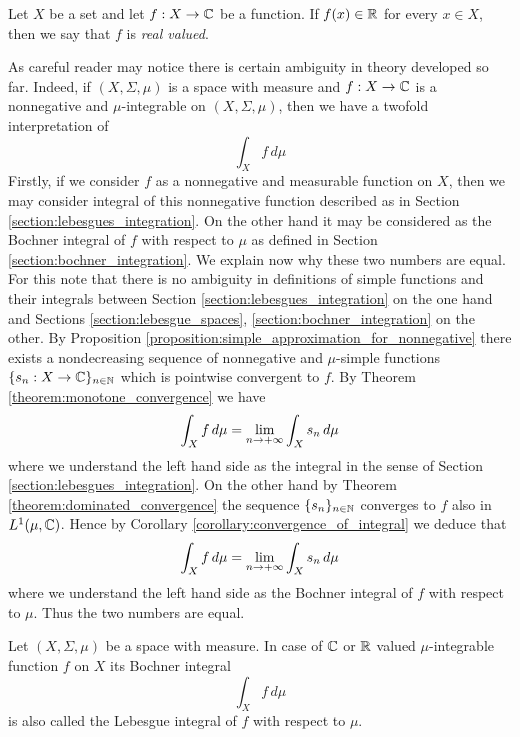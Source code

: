 \documentclass[10pt]{amsart}
\begin{document}
\begin{definition}
	Let $X$ be a set and let $f:X\rightarrow {\mathbb C}$ be a function. If $f(x)\in {\mathbb R}$ for every $x\in X$, then we say that $f$ is \textit{real valued}. 
\end{definition}
\noindent
As careful reader may notice there is certain ambiguity in theory developed so far. Indeed, if $(X,\Sigma,\mu)$ is a space with measure and $f:X\rightarrow {\mathbb C}$ is a nonnegative and $\mu$-integrable on $(X,\Sigma, \mu)$, then we have a twofold interpretation of
$$\int_Xf\,d\mu$$
Firstly, if we consider $f$ as a nonnegative and measurable function on $X$, then we may consider integral of this nonnegative function described as in Section \ref{section:lebesgues_integration}. On the other hand it may be considered as the Bochner integral of $f$ with respect to $\mu$ as defined in Section \ref{section:bochner_integration}. We explain now why these two numbers are equal. For this note that there is no ambiguity in definitions of simple functions and their integrals between Section \ref{section:lebesgues_integration} on the one hand and Sections \ref{section:lebesgue_spaces}, \ref{section:bochner_integration} on the other. By Proposition \ref{proposition:simple_approximation_for_nonnegative} there exists a nondecreasing sequence of nonnegative and $\mu$-simple functions $\{s_n:X\rightarrow {\mathbb C}\}_{n\in {\mathbb N}}$ which is pointwise convergent to $f$. By Theorem \ref{theorem:monotone_convergence} we have
$$\int_Xf\,d\mu = \lim_{n\rightarrow +\infty}\int_Xs_n\,d\mu$$
where we understand the left hand side as the integral in the sense of Section \ref{section:lebesgues_integration}. On the other hand by Theorem \ref{theorem:dominated_convergence} the sequence $\{s_n\}_{n\in {\mathbb N}}$ converges to $f$ also in $L^1(\mu,{\mathbb C})$. Hence by Corollary \ref{corollary:convergence_of_integral} we deduce that
$$\int_Xf\,d\mu = \lim_{n\rightarrow +\infty}\int_Xs_n\,d\mu$$
where we understand the left hand side as the Bochner integral of $f$ with respect to $\mu$. Thus the two numbers are equal.

Let $(X,\Sigma, \mu)$ be a space with measure. In case of ${\mathbb C}$ or ${\mathbb R}$ valued $\mu$-integrable function $f$ on $X$ its Bochner integral
$$\int_X f\,d\mu$$
is also called the Lebesgue integral of $f$ with respect to $\mu$.






\small


\end{document}
